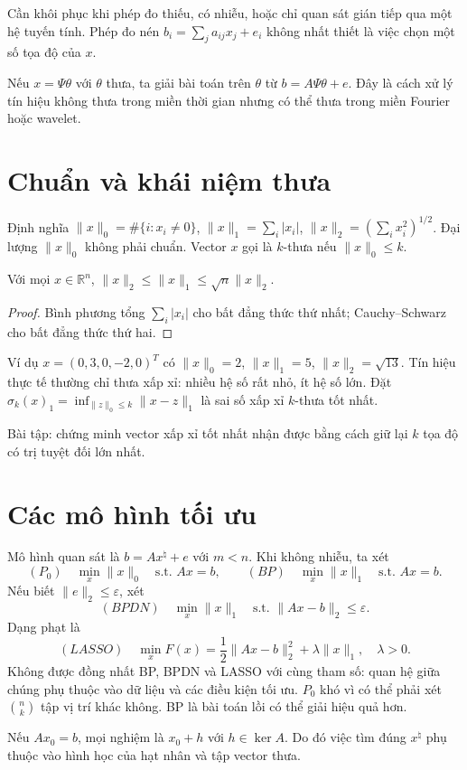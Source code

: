 \documentclass[12pt,a4paper]{article}
\newcommand{\R}{\mathbb R}\newcommand{\supp}{\operatorname{supp}}\newcommand{\spark}{\operatorname{spark}}
\begin{document}
Cần khôi phục khi phép đo thiếu, có nhiễu, hoặc chỉ quan sát gián tiếp qua một hệ tuyến tính. Phép đo nén $b_i=\sum_j a_{ij}x_j+e_i$ không nhất thiết là việc chọn một số tọa độ của $x$.

Nếu $x=\Psi\theta$ với $\theta$ thưa, ta giải bài toán trên $\theta$ từ $b=A\Psi\theta+e$. Đây là cách xử lý tín hiệu không thưa trong miền thời gian nhưng có thể thưa trong miền Fourier hoặc wavelet.
\clearpage
\section{Chuẩn và khái niệm thưa}
Định nghĩa $\|x\|_0=\#\{i:x_i\ne0\}$, $\|x\|_1=\sum_i|x_i|$, $\|x\|_2=(\sum_i x_i^2)^{1/2}$. Đại lượng $\|x\|_0$ không phải chuẩn. Vector $x$ gọi là $k$-thưa nếu $\|x\|_0\le k$.

\begin{lemma}Với mọi $x\in\R^n$, $\|x\|_2\le\|x\|_1\le\sqrt n\|x\|_2$.\end{lemma}
\begin{proof}Bình phương tổng $\sum_i|x_i|$ cho bất đẳng thức thứ nhất; Cauchy--Schwarz cho bất đẳng thức thứ hai.\end{proof}

Ví dụ $x=(0,3,0,-2,0)^T$ có $\|x\|_0=2$, $\|x\|_1=5$, $\|x\|_2=\sqrt{13}$. Tín hiệu thực tế thường chỉ thưa xấp xỉ: nhiều hệ số rất nhỏ, ít hệ số lớn. Đặt $\sigma_k(x)_1=\inf_{\|z\|_0\le k}\|x-z\|_1$ là sai số xấp xỉ $k$-thưa tốt nhất.

Bài tập: chứng minh vector xấp xỉ tốt nhất nhận được bằng cách giữ lại $k$ tọa độ có trị tuyệt đối lớn nhất.
\clearpage
\section{Các mô hình tối ưu}
Mô hình quan sát là $b=Ax^\natural+e$ với $m<n$. Khi không nhiễu, ta xét
\[(P_0)\quad\min_x\|x\|_0\quad\text{s.t. }Ax=b,\qquad (BP)\quad\min_x\|x\|_1\quad\text{s.t. }Ax=b.\]
Nếu biết $\|e\|_2\le\varepsilon$, xét
\[(BPDN)\quad\min_x\|x\|_1\quad\text{s.t. }\|Ax-b\|_2\le\varepsilon.\]
Dạng phạt là
\[(LASSO)\quad\min_x F(x)=\frac12\|Ax-b\|_2^2+\lambda\|x\|_1,\quad\lambda>0.\]
Không được đồng nhất BP, BPDN và LASSO với cùng tham số: quan hệ giữa chúng phụ thuộc vào dữ liệu và các điều kiện tối ưu. $P_0$ khó vì có thể phải xét $\binom nk$ tập vị trí khác không. BP là bài toán lồi có thể giải hiệu quả hơn.

Nếu $Ax_0=b$, mọi nghiệm là $x_0+h$ với $h\in\ker A$. Do đó việc tìm đúng $x^\natural$ phụ thuộc vào hình học của hạt nhân và tập vector thưa.
\clearpage
\end{document}
